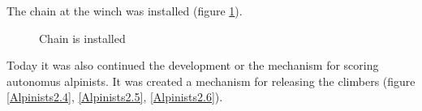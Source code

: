 The chain at the winch was installed (figure \ref{Winch2.10}).

\begin{figure}[H]
	\begin{minipage}[h]{1\linewidth}
		\caption{Chain is installed}
		\label{Winch2.10}
	\end{minipage}
\end{figure}

Today it was also continued the development or the mechanism for scoring autonomus alpinists. It was created a mechanism for releasing the climbers (figure \ref{Alpinists2.4}, \ref{Alpinists2.5}, \ref{Alpinists2.6}).

